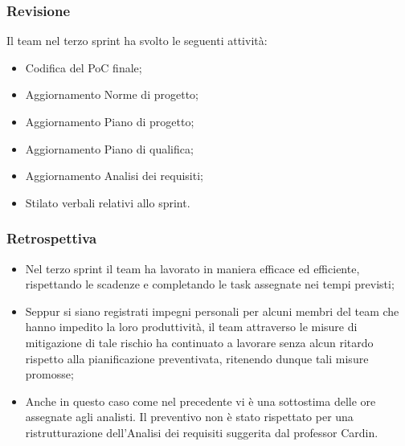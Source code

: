 \documentclass[10pt, a4paper]{article}
\begin{document}
\subsubsection{Revisione}
Il team nel terzo sprint ha svolto le seguenti attività:
\begin{itemize}
    \item Codifica del PoC finale;
    \item Aggiornamento Norme di progetto;
    \item Aggiornamento Piano di progetto;
    \item Aggiornamento Piano di qualifica;
    \item Aggiornamento Analisi dei requisiti;
    \item Stilato verbali relativi allo sprint.
\end{itemize}
\subsubsection{Retrospettiva}
\begin{itemize}
    \item Nel terzo sprint il team ha lavorato in maniera efficace ed efficiente, rispettando le scadenze e completando le task assegnate nei tempi previsti;
    \item Seppur si siano registrati impegni personali per alcuni membri del team che hanno impedito la loro produttività, il team attraverso le misure di mitigazione di tale rischio
    ha continuato a lavorare senza alcun ritardo rispetto alla pianificazione preventivata, ritenendo dunque tali misure promosse;
    \item Anche in questo caso come nel precedente vi è una sottostima delle ore assegnate agli analisti. Il preventivo non è stato rispettato per una ristrutturazione 
    dell'Analisi dei requisiti suggerita dal professor Cardin.
\end{itemize}
\end{document}
